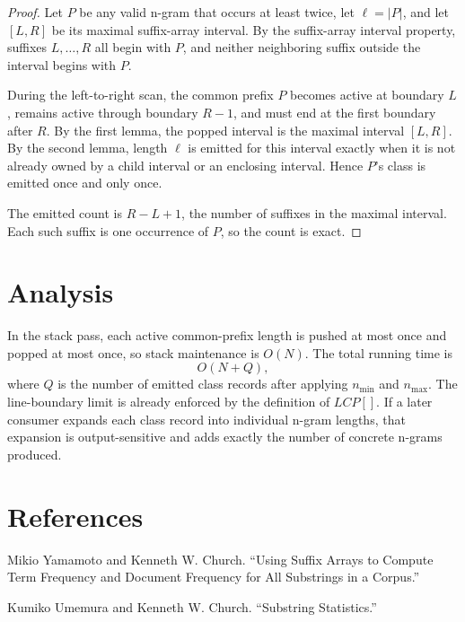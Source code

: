 \documentclass[11pt]{article}
\begin{document}
\begin{proof}
Let \(P\) be any valid n-gram that occurs at least twice, let
\(\ell=|P|\), and let \([L,R]\) be its maximal suffix-array interval.  By the
suffix-array interval property, suffixes \(L,\ldots,R\) all begin with \(P\),
and neither neighboring suffix outside the interval begins with \(P\).

During the left-to-right scan, the common prefix \(P\) becomes active at
boundary \(L\), remains active through boundary \(R-1\), and must end at the
first boundary after \(R\).  By the first lemma, the popped interval is
the maximal interval \([L,R]\).  By the second lemma, length \(\ell\) is emitted
for this interval exactly when it is not already owned by a child interval or an
enclosing interval.  Hence \(P\)'s class is emitted once and only once.

The emitted count is \(R-L+1\), the number of suffixes in the maximal interval.
Each such suffix is one occurrence of \(P\), so the count is exact.
\end{proof}

\section{Analysis}

In the stack pass, each active common-prefix length is pushed at most once and
popped at most once, so stack maintenance is \(O(N)\).  The total running time is
\[
O(N+Q),
\]
where \(Q\) is the number of emitted class records after applying \(n_{\min}\)
and \(n_{\max}\).  The line-boundary limit is already enforced by the definition
of \(\mathit{LCP}[]\).  If a later consumer expands each class record into
individual n-gram lengths, that expansion is output-sensitive and adds exactly
the number of concrete n-grams produced.

\section{References}

Mikio Yamamoto and Kenneth W. Church. ``Using Suffix Arrays to Compute Term
Frequency and Document Frequency for All Substrings in a Corpus.''

Kumiko Umemura and Kenneth W. Church. ``Substring Statistics.''
\end{document}
